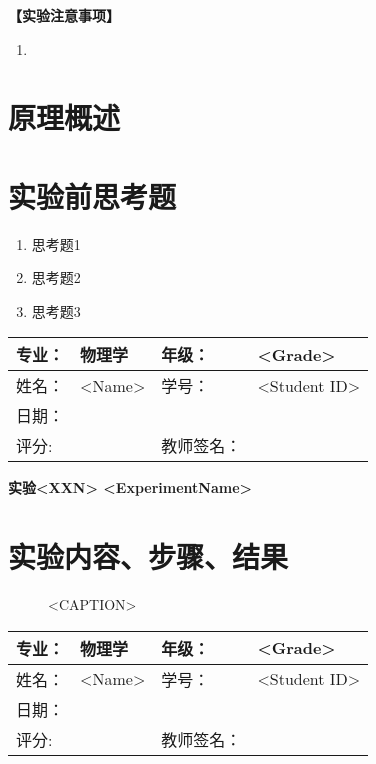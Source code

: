 \documentclass{ctexart}
\numberwithin{equation}{section}%
\newcommand{\ExpTitle}{实验<XXN> <ExperimentName>}
\newcommand{\Grade}{<Grade>}
\newcommand{\stuName}{<Name>}
\newcommand{\stuID}{<Student ID>}
\theoremstyle{ansstyle}
\begin{document}
\large{\textbf{【实验注意事项】}} 

\begin{enumerate}
    \item 
\end{enumerate}

\section{原理概述}


\section{实验前思考题}
\begin{enumerate}
    \item 思考题1
    \item 思考题2
    \item 思考题3
\end{enumerate}

\newpage

\begin{center}
    \begin{tabular}{|p{2cm}|p{4cm}|p{4cm}|p{4cm}|}
        \hline
        专业： & 物理学 & 年级： & \Grade \\
        \hline
        姓名： & \stuName & 学号： & \stuID \\
        \hline
        日期： &  & & \\
        \hline
        评分:  &   & 教师签名：& \\
        \hline
    \end{tabular}
\end{center}

\begin{center}
    \LARGE{\textbf{\ExpTitle}}
\end{center}

\section{实验内容、步骤、结果}
\begin{figure}[H]
	\centering
	\caption{<CAPTION>}
\end{figure}

\newpage

\begin{center}
    \begin{tabular}{|p{2cm}|p{4cm}|p{4cm}|p{4cm}|}
        \hline
        专业： & 物理学 & 年级： & \Grade \\
        \hline
        姓名： & \stuName & 学号： & \stuID \\
        \hline
        日期： &  & & \\
        \hline
        评分:  &   & 教师签名：& \\
        \hline
    \end{tabular}
\end{center}
\end{document}
